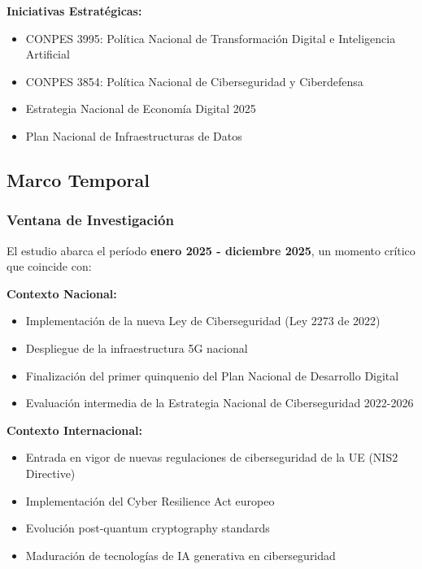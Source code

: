 \textbf{Iniciativas Estratégicas:}
\begin{itemize}
    \item CONPES 3995: Política Nacional de Transformación Digital e Inteligencia Artificial
    \item CONPES 3854: Política Nacional de Ciberseguridad y Ciberdefensa
    \item Estrategia Nacional de Economía Digital 2025
    \item Plan Nacional de Infraestructuras de Datos
\end{itemize}

\subsection{Marco Temporal}

\subsubsection{Ventana de Investigación}
El estudio abarca el período \textbf{enero 2025 - diciembre 2025}, un momento crítico que coincide con:

\textbf{Contexto Nacional:}
\begin{itemize}
    \item Implementación de la nueva Ley de Ciberseguridad (Ley 2273 de 2022)
    \item Despliegue de la infraestructura 5G nacional
    \item Finalización del primer quinquenio del Plan Nacional de Desarrollo Digital
    \item Evaluación intermedia de la Estrategia Nacional de Ciberseguridad 2022-2026
\end{itemize}

\textbf{Contexto Internacional:}
\begin{itemize}
    \item Entrada en vigor de nuevas regulaciones de ciberseguridad de la UE (NIS2 Directive)
    \item Implementación del Cyber Resilience Act europeo
    \item Evolución post-quantum cryptography standards
    \item Maduración de tecnologías de IA generativa en ciberseguridad
\end{itemize}

